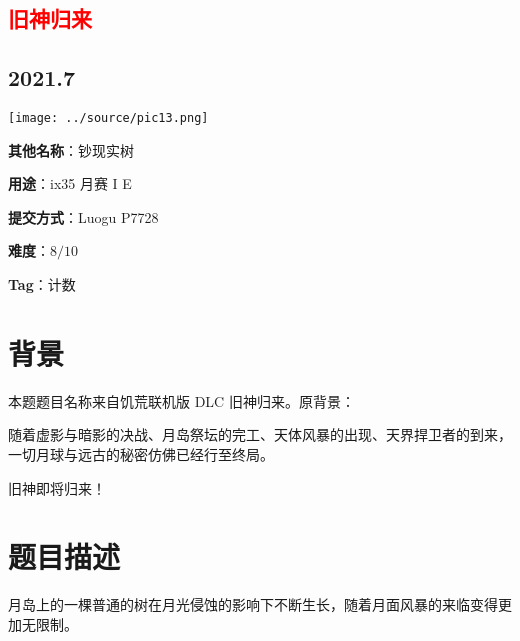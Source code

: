 \documentclass[a4paper,10pt]{article}
\begin{document}
\vspace*{\fill}
\begin{center}

\section{\textcolor{red}{旧神归来}}

\subsection*{2021.7}

\vspace{10pt}

\texttt{[image: ../source/pic13.png]}

\vspace{10pt}

\textbf{其他名称}：钞现实树

\vspace{10pt}

\textbf{用途}：ix35 月赛 I E

\vspace{10pt}

\textbf{提交方式}：Luogu P7728

\vspace{10pt}

\textbf{难度}：$8/10$

\vspace{10pt}

\textbf{Tag}：计数

\end{center}
\vspace*{\fill}

\newpage

\section*{背景}

本题题目名称来自饥荒联机版 DLC 旧神归来。原背景：

随着虚影与暗影的决战、月岛祭坛的完工、天体风暴的出现、天界捍卫者的到来，一切月球与远古的秘密仿佛已经行至终局。

旧神即将归来！

\section*{题目描述}

月岛上的一棵普通的树在月光侵蚀的影响下不断生长，随着月面风暴的来临变得更加无限制。
\end{document}

